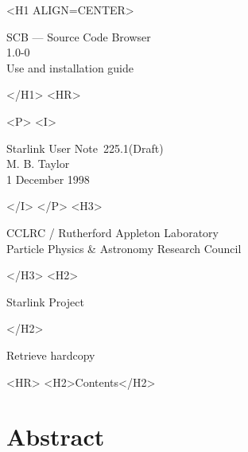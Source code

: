 \documentclass[twoside,11pt]{article}
\newcommand{\stardoccategory}  {Starlink User Note}
\newcommand{\stardocsource}    {sun\stardocnumber}
\newcommand{\stardocnumber}    {225.1(Draft)}
\newcommand{\stardocauthors}   {M. B. Taylor}
\newcommand{\stardocdate}      {1 December 1998}
\newcommand{\stardoctitle}     {SCB --- Source Code Browser}
\newcommand{\stardocversion}   {1.0-0}
\newcommand{\stardocmanual}    {Use and installation guide}
\newcommand{\htmladdnormallink}[2]{#1}
\newcommand{\htmladdimg}[1]{}
\newcommand{\htmlref}[2]{#1}
\newcommand{\htmladdtonavigation}[1]{}
\newcommand{\xlabel}[1]{}
\renewcommand{\_}{\texttt{\symbol{95}}}
\begin{document}
\begin{htmlonly}
   \xlabel{}
   \begin{rawhtml} <H1 ALIGN=CENTER> \end{rawhtml}
      \stardoctitle\\
      \stardocversion\\
      \stardocmanual
   \begin{rawhtml} </H1> <HR> \end{rawhtml}


   \begin{rawhtml} <P> <I> \end{rawhtml}
   \stardoccategory\ \stardocnumber \\
   \stardocauthors \\
   \stardocdate
   \begin{rawhtml} </I> </P> <H3> \end{rawhtml}
      \htmladdnormallink{CCLRC}{http://www.cclrc.ac.uk} /
      \htmladdnormallink{Rutherford Appleton Laboratory}
                        {http://www.cclrc.ac.uk/ral} \\
      \htmladdnormallink{Particle Physics \& Astronomy Research Council}
                        {http://www.pparc.ac.uk} \\
   \begin{rawhtml} </H3> <H2> \end{rawhtml}
      \htmladdnormallink{Starlink Project}{http://star-www.rl.ac.uk/}
   \begin{rawhtml} </H2> \end{rawhtml}
   \htmladdnormallink{\htmladdimg{source.gif} Retrieve hardcopy}
      {http://star-www.rl.ac.uk/cgi-bin/hcserver?\stardocsource}\\

  \label{stardoccontents}
  \begin{rawhtml} 
    <HR>
    <H2>Contents</H2>
  \end{rawhtml}
  \htmladdtonavigation{\htmlref{\htmladdimg{contents_motif.gif}}
        {stardoccontents}}

  \section{\xlabel{abstract}Abstract}
\end{htmlonly}
\end{document}
